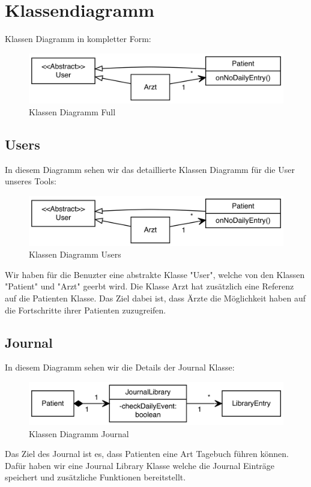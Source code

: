 \chapter{Klassendiagramm}
Klassen Diagramm in kompletter Form:
\begin{figure}[H]
\centering
\includegraphics[width=1\textwidth]{../ClassDiagramms/Users.png}
\caption{Klassen Diagramm Full}
\end{figure}

\section{Users}
In diesem Diagramm sehen wir das detaillierte Klassen Diagramm für die User unseres Tools:
\begin{figure}[H]
\centering
\includegraphics[width=1\textwidth]{../ClassDiagramms/Users.png}
\caption{Klassen Diagramm Users}
\end{figure}
Wir haben für die Benuzter eine abstrakte Klasse "User", welche von den Klassen "Patient" und "Arzt" geerbt wird. Die Klasse Arzt hat zusätzlich eine Referenz auf die Patienten Klasse. Das Ziel dabei ist, dass Ärzte die Möglichkeit haben auf die Fortschritte ihrer Patienten zuzugreifen.
\newpage
\section{Journal}
In diesem Diagramm sehen wir die Details der Journal Klasse:
\begin{figure}[H]
\centering
\includegraphics[width=1\textwidth]{../ClassDiagramms/Journal.png}
\caption{Klassen Diagramm Journal}
\end{figure}
Das Ziel des Journal ist es, dass Patienten eine Art Tagebuch führen können. Dafür haben wir eine Journal Library Klasse welche die Journal Einträge speichert und zusätzliche Funktionen bereitstellt.

